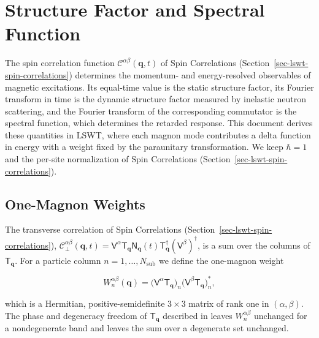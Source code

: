 
\hypertarget{sec-lswt-structure-factor-and-spectral-function}{%
\section{Structure Factor and Spectral Function}\label{sec-lswt-structure-factor-and-spectral-function}}

The spin correlation function \(\mathcal C^{\alpha\beta}(\mathbf q,t)\) of Spin Correlations (Section~\ref{sec-lswt-spin-correlations}) determines the momentum- and energy-resolved observables of magnetic excitations. Its equal-time value is the static structure factor, its Fourier transform in time is the dynamic structure factor measured by inelastic neutron scattering, and the Fourier transform of the corresponding commutator is the spectral function, which determines the retarded response. This document derives these quantities in LSWT, where each magnon mode contributes a delta function in energy with a weight fixed by the paraunitary transformation. We keep \(\hbar=1\) and the per-site normalization of Spin Correlations (Section~\ref{sec-lswt-spin-correlations}).

\subsection{One-Magnon Weights}

The transverse correlation of Spin Correlations (Section~\ref{sec-lswt-spin-correlations}), \(\mathcal C_\perp^{\alpha\beta}(\mathbf q,t)=\mathsf V^\alpha\mathsf T_{\mathbf q}\mathsf N_{\mathbf q}(t)\mathsf T_{\mathbf q}^\dagger(\mathsf V^\beta)^\dagger\), is a sum over the columns of \(\mathsf T_{\mathbf q}\). For a particle column \(n=1,\ldots,N_{\mathrm{sub}}\) we define the one-magnon weight

\begin{equation}\label{eq-lswt-one-magnon-weight}
W_n^{\alpha\beta}(\mathbf q)
=\big(\mathsf V^\alpha\mathsf T_{\mathbf q}\big)_n\big(\mathsf V^\beta\mathsf T_{\mathbf q}\big)_n^*,
\end{equation}

which is a Hermitian, positive-semidefinite \(3\times3\) matrix of rank one in \((\alpha,\beta)\). The phase and degeneracy freedom of \(\mathsf T_{\mathbf q}\) described in  leaves \(W_n^{\alpha\beta}\) unchanged for a nondegenerate band and leaves the sum over a degenerate set unchanged.

